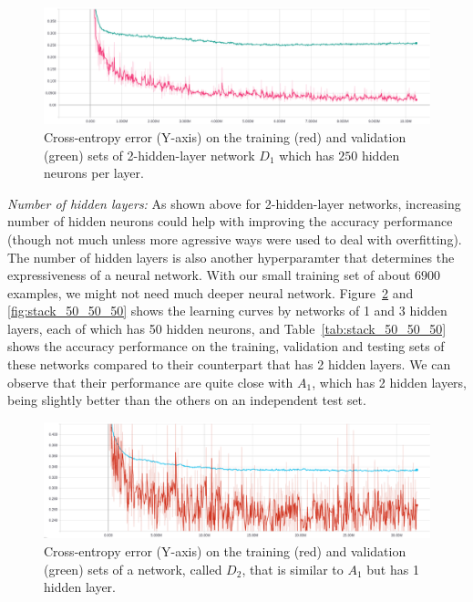 \documentclass[12pt]{article}
\begin{document}
\begin{figure}
  \includegraphics[width=\linewidth]{figures/stack_250_250_dropout_elu/learning_curves.eps}
  \caption{Cross-entropy error (Y-axis) on the training (red) and validation (green) sets of 2-hidden-layer network $D_1$ which has $250$ hidden neurons per layer.}
  \label{fig:stack_250_250_dropout_elu}
\end{figure}

\vspace{5mm}
\noindent
\textit{Number of hidden layers:} As shown above for 2-hidden-layer networks, increasing number of hidden neurons could help with improving the accuracy performance (though not much unless more agressive ways were used to deal with overfitting). The number of hidden layers is also another hyperparamter that determines the expressiveness of a neural network. With our small training set of about $6900$ examples, we might not need much deeper neural network. Figure~\ref{fig:stack_50} and \ref{fig:stack_50_50_50} shows the learning curves by networks of 1 and 3 hidden layers, each of which has 50 hidden neurons, and Table~\ref{tab:stack_50_50_50} shows the accuracy performance on the training, validation and testing sets of these networks compared to their counterpart that has 2 hidden layers. We can observe that their performance are quite close with $A_1$, which has 2 hidden layers, being slightly better than the others on an independent test set.

\begin{figure}
  \includegraphics[width=\linewidth]{figures/stack_50_dropout_elu/learning_curves.eps}
  \caption{Cross-entropy error (Y-axis) on the training (red) and validation (green) sets of a network, called $D_2$, that is similar to $A_1$ but has 1 hidden layer.}
  \label{fig:stack_50}
\end{figure}
\end{document}
